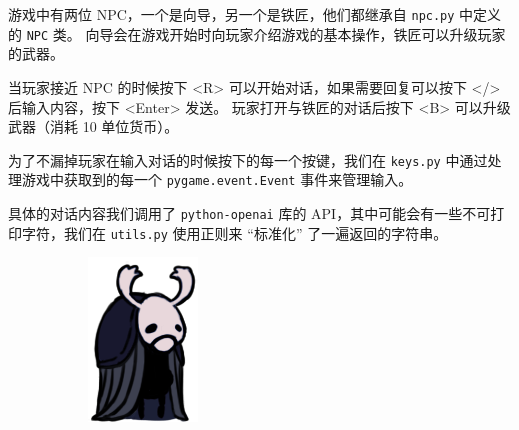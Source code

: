 \documentclass[12pt, twoside, a4paper]{article}
\newcommand{\inlinecode}[1]{\setlength{\fboxsep}{0.8mm} \colorbox{lightgray!40}{\texttt{#1}}}
\begin{document}
游戏中有两位 NPC，一个是向导，另一个是铁匠，他们都继承自 \inlinecode{npc.py} 中定义的 \inlinecode{NPC} 类。
向导会在游戏开始时向玩家介绍游戏的基本操作，铁匠可以升级玩家的武器。

当玩家接近 NPC 的时候按下 <R> 可以开始对话，如果需要回复可以按下 </> 后输入内容，按下 <Enter> 发送。
玩家打开与铁匠的对话后按下 <B> 可以升级武器（消耗 10 单位货币）。

为了不漏掉玩家在输入对话的时候按下的每一个按键，我们在 \inlinecode{keys.py} 中通过处理游戏中获取到的每一个
\inlinecode{pygame.event.Event} 事件来管理输入。

具体的对话内容我们调用了 \inlinecode{python-openai} 库的 API，其中可能会有一些不可打印字符，我们在
\inlinecode{utils.py} 使用正则来 “标准化” 了一遍返回的字符串。

\begin{figure}[h!]
    \centering
    \begin{subfigure}{0.15\textwidth}
        \includegraphics[width=\textwidth]{assets/report/tutorial.png}

\end{subfigure}
\end{figure}
\end{document}
